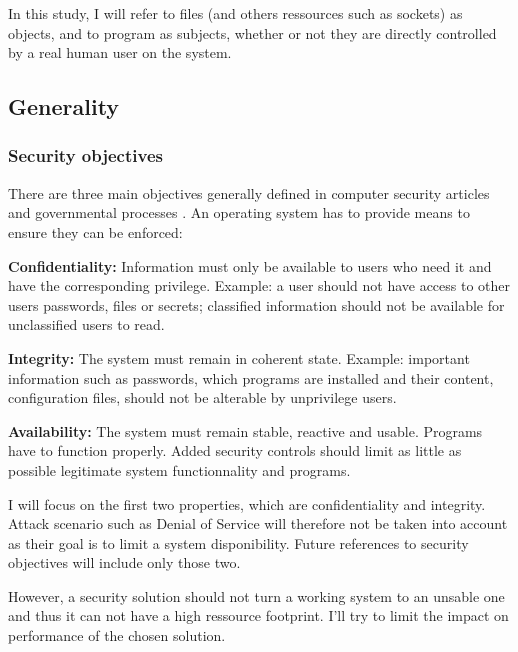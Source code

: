 \documentclass[pdftex,a4paper,titlepage,11pt]{article}
\begin{document}
\bigskip

In this study, I will refer to files (and others ressources such as sockets) as
objects, and to program as subjects, whether or not they are directly controlled
by a real human user on the system.

\subsection{Generality}

\subsubsection{Security objectives}

There are three main objectives generally defined in computer security articles
and governmental processes \cite{tcsec1986}. An operating system has to provide
means to ensure they can be enforced:

\bigskip

\textbf{Confidentiality:}
Information must only be available to users who need it and have the
corresponding privilege. Example: a user should not have access to other users
passwords, files or secrets; classified information should not be available for
unclassified users to read.

\medskip

\textbf{Integrity:}
The system must remain in coherent state. Example: important information such
as passwords, which programs are installed and their content, configuration
files, should not be alterable by unprivilege users.

\medskip

\textbf{Availability:}
The system must remain stable, reactive and usable. Programs have to function
properly. Added security controls should limit as little as possible legitimate
system functionnality and programs.

\bigskip

I will focus on the first two properties, which are confidentiality and
integrity. Attack scenario such as Denial of Service will therefore not be taken
into account as their goal is to limit a system disponibility. Future references
to security objectives will include only those two.

\bigskip

However, a security solution should not turn a working system to an unsable one
and thus it can not have a high ressource footprint. I'll try to limit the
impact on performance of the chosen solution.
\end{document}
